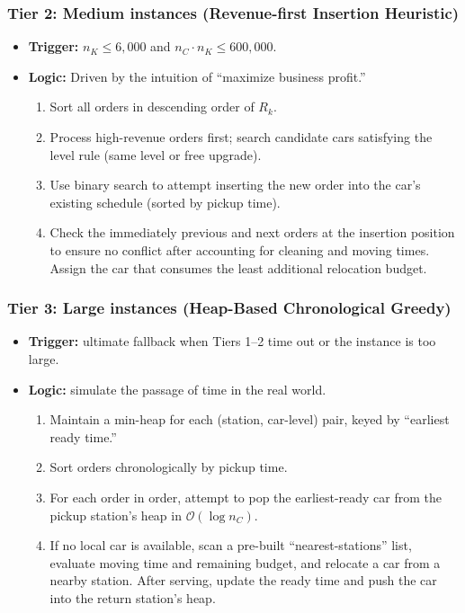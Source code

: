 \documentclass[a4paper, 12pt]{article}
\begin{document}
\subsubsection*{Tier 2: Medium instances (Revenue-first Insertion Heuristic)}
\begin{itemize}
    \item \textbf{Trigger:} $n_K \le 6{,}000$ and $n_C\cdot n_K \le 600{,}000$.
    \item \textbf{Logic:} Driven by the intuition of ``maximize business profit.''
    \begin{enumerate}[label=\textbf{\alph*.}]
        \item Sort all orders in descending order of $R_k$.
        \item Process high-revenue orders first; search candidate cars satisfying the level rule (same level or free upgrade).
        \item Use binary search to attempt inserting the new order into the car's existing schedule (sorted by pickup time).
        \item Check the immediately previous and next orders at the insertion position to ensure no conflict after accounting for cleaning and moving times. Assign the car that consumes the least additional relocation budget.
    \end{enumerate}
\end{itemize}

\subsubsection*{Tier 3: Large instances (Heap-Based Chronological Greedy)}
\begin{itemize}
    \item \textbf{Trigger:} ultimate fallback when Tiers 1--2 time out or the instance is too large.
    \item \textbf{Logic:} simulate the passage of time in the real world.
    \begin{enumerate}[label=\textbf{\alph*.}]
        \item Maintain a min-heap for each (station, car-level) pair, keyed by ``earliest ready time.''
        \item Sort orders chronologically by pickup time.
        \item For each order in order, attempt to pop the earliest-ready car from the pickup station's heap in $\mathcal{O}(\log n_C)$.
        \item If no local car is available, scan a pre-built ``nearest-stations'' list, evaluate moving time and remaining budget, and relocate a car from a nearby station. After serving, update the ready time and push the car into the return station's heap.
    \end{enumerate}
\end{itemize}
\end{document}
